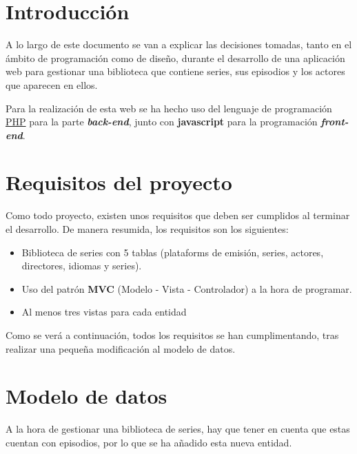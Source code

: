 \documentclass{\ClassPath/viu-tfm-template}
\begin{document}
\graphicspath{{../../VIU_TFM_LaTeX_template/}}

\coverpage

\tableofcontents

\chapter{Introducción}

A lo largo de este documento se van a explicar las decisiones tomadas, tanto en el ámbito de programación como de diseño, durante el desarrollo de una aplicación web para gestionar una biblioteca que contiene series, sus episodios y los actores que aparecen en ellos.

Para la realización de esta web se ha hecho uso del lenguaje de programación \href{https://www.php.net/}{PHP} para la parte \textit{\textbf{back-end}}, junto con \textbf{javascript} para la programación \textbf{\textit{front-end}}.


\chapter{Requisitos del proyecto}

Como todo proyecto, existen unos requisitos que deben ser cumplidos al terminar el desarrollo. De manera resumida, los requisitos son los siguientes:

\vspace{-1em}
\begin{itemize}
    \item Biblioteca de series con 5 tablas (plataforms de emisión, series, actores, directores, idiomas y series).
    \item Uso del patrón \textbf{MVC} (Modelo - Vista - Controlador) a la hora     de programar.
    \item Al menos tres vistas para cada entidad
\end{itemize}
\vspace{-1em}

Como se verá a continuación, todos los requisitos se han cumplimentando, tras realizar una pequeña modificación al modelo de datos.

\chapter{Modelo de datos}
A la hora de gestionar una biblioteca de series, hay que tener en cuenta que estas cuentan con episodios, por lo que se ha añadido esta nueva entidad.
\end{document}

